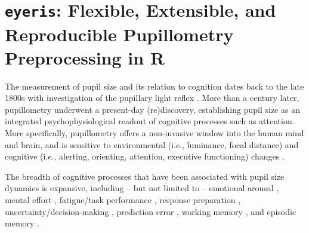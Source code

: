 \chapter[\texttt{eyeris}: Flexible, Extensible, and Reproducible Pupillometry Preprocessing]{\texttt{eyeris}: Flexible, Extensible, and Reproducible Pupillometry Preprocessing in R}\label{ch:eyeris}

The measurement of pupil size and its relation to cognition dates back to the late 1800s with investigation of the pupillary light reflex \parencite{haab1886vortrag}. More than a century later, pupillometry underwent a present-day (re)discovery, establishing pupil size as an integrated psychophysiological readout of cognitive processes such as attention. More specifically, pupillometry offers a non-invasive window into the human mind and brain, and is sensitive to environmental (i.e., luminance, focal distance) and cognitive (i.e., alerting, orienting, attention, executive functioning) changes \parencite{huang2024locus,strauch2024forgotten,strauch2022pupillometry}.

The breadth of cognitive processes that have been associated with pupil size dynamics is expansive, including – but not limited to – emotional arousal \parencite{bradley2008pupil,oliva2018pupil}, mental effort \parencite{kahneman1966pupil,kramer2013processing}, fatigue/task performance \parencite{astonjones2005integrative,eldar2013effects,knapen2016cognitive,mcginley2015cortical,murphy2011pupillometry}, response preparation \parencite{einhauser2008pupil,reimer2014pupil}, uncertainty/decision-making \parencite{gee2014decision,jepma2011pupil,kawaguchi2018differentiating}, prediction error \parencite{alamia2019pupil}, working memory \parencite{keene2022pupillometry,robison2019pupillometry,unsworth2015individual,unsworth2017importance,unsworth2017locus}, and episodic memory \parencite{clewett2020pupil,madore2020memory,madore2022readiness,miller2019individual,miller2020variation,robison2022pupillary,schwartz2025attending}.

